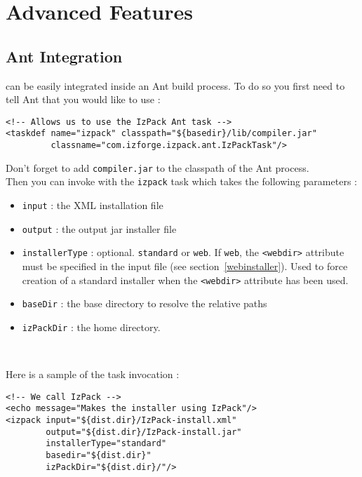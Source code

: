 \chapter{Advanced Features}

\section{Ant Integration}
\label{ant-integration}

\IzPack can be easily integrated inside an Ant build process. To do so you
first need to tell Ant that you would like to use \IzPack :
\footnotesize
\begin{verbatim}
<!-- Allows us to use the IzPack Ant task -->
<taskdef name="izpack" classpath="${basedir}/lib/compiler.jar"
         classname="com.izforge.izpack.ant.IzPackTask"/>
\end{verbatim}
\normalsize

Don't forget to add \texttt{compiler.jar} to the classpath of the Ant process.\\

Then you can invoke \IzPack with the \texttt{izpack} task which takes the
following parameters :
\begin{itemize}

  \item \texttt{input} : the XML installation file
  \item \texttt{output} : the output jar installer file
  \item \texttt{installerType} : optional. \texttt{standard} or
    \texttt{web}. If \texttt{web}, the \texttt{<webdir>} attribute
    must be specified in the input file (see
    section~\ref{webinstaller}). Used to force creation of a standard
    installer when the \texttt{<webdir>} attribute has been used.
  \item \texttt{baseDir} : the base directory to resolve the relative paths
  \item \texttt{izPackDir} : the \IzPack home directory.
  
\end{itemize}\

Here is a sample of the task invocation :\\
\footnotesize
\begin{verbatim}
<!-- We call IzPack -->
<echo message="Makes the installer using IzPack"/>
<izpack input="${dist.dir}/IzPack-install.xml"
        output="${dist.dir}/IzPack-install.jar"
        installerType="standard"
        basedir="${dist.dir}"
        izPackDir="${dist.dir}/"/>
\end{verbatim}
\normalsize

